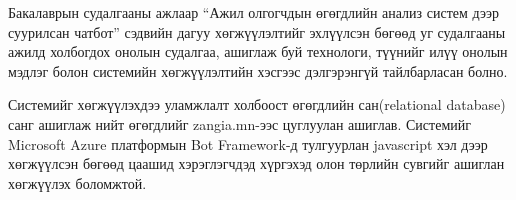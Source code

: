 
\quad Бакалаврын судалгааны ажлаар ``Ажил олгогчдын өгөгдлийн анализ систем дээр суурилсан чатбот'' сэдвийн дагуу хөгжүүлэлтийг эхлүүлсэн бөгөөд уг судалгааны ажилд холбогдох онолын судалгаа, ашиглаж буй технологи, түүнийг илүү онолын мэдлэг болон системийн хөгжүүлэлтийн хэсгээс дэлгэрэнгүй тайлбарласан болно.

Системийг хөгжүүлэхдээ уламжлалт холбоост өгөгдлийн сан(relational database) санг ашиглаж нийт өгөгдлийг zangia.mn-ээс цуглуулан ашиглав. Системийг Microsoft Azure платформын Bot Framework-д тулгуурлан javascript хэл дээр хөгжүүлсэн бөгөөд цаашид хэрэглэгчдэд хүргэхэд олон төрлийн сувгийг ашиглан хөгжүүлэх боломжтой.